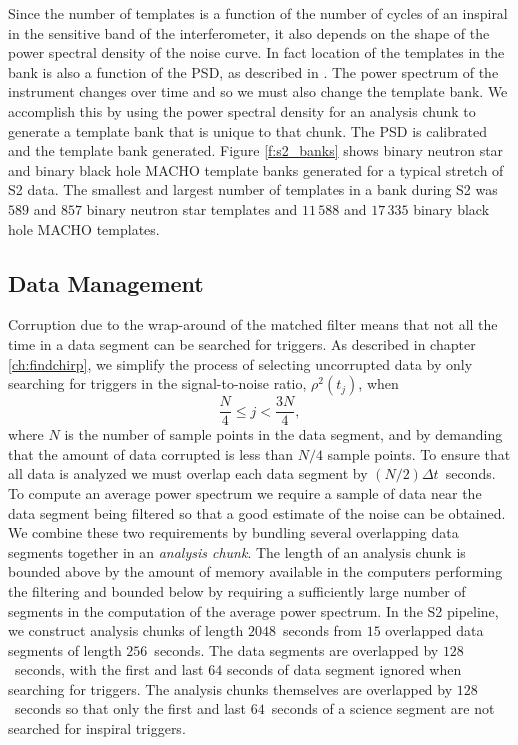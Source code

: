 Since the number of templates is a function of the number of cycles of an
inspiral in the sensitive band of the interferometer, it also depends on the
shape of the power spectral density of the noise curve. In fact location of
the templates in the bank is also a function of the PSD, as described in
\cite{Owen:1998dk}. The power spectrum of the instrument changes over time and
so we must also change the template bank. We accomplish this by using the
power spectral density for an analysis chunk to generate a template bank that
is unique to that chunk. The PSD is calibrated and the template bank
generated. Figure \ref{f:s2_banks} shows binary neutron star and binary
black hole MACHO template banks generated for a typical stretch of S2 data.
The smallest and largest number of templates in a bank during S2 was $589$ and
$857$ binary neutron star templates and $11\,588$ and $17\,335$ binary black
hole MACHO templates.

\subsection{Data Management}
\label{ss:datamanagement}

Corruption due to the wrap-around of the matched filter means that not all the
time in a data segment can be searched for triggers. As described  in chapter
\ref{ch:findchirp}, we simplify the process of selecting uncorrupted data by
only searching for triggers in the signal-to-noise ratio, $\rho^2(t_j)$, when 
\begin{equation}
\frac{N}{4} \le j < \frac{3N}{4},
\end{equation}
where $N$ is the number of sample points in the data segment, and by demanding
that the amount of data corrupted is less than $N/4$ sample points. To ensure
that all data is analyzed we must overlap each data segment by $(N/2)\Delta 
t$~seconds. To compute an average power spectrum we require a sample of data
near the data segment being filtered so that a good estimate of the noise can
be obtained. We combine these two requirements by bundling several overlapping
data segments together in an \emph{analysis chunk}. The length of an analysis
chunk is bounded above by the amount of memory available in the computers
performing the filtering and bounded below by requiring a sufficiently large
number of segments in the computation of the average power spectrum. In the S2
pipeline, we construct analysis chunks of length $2048$~seconds from $15$
overlapped data segments of length $256$~seconds. The data segments are
overlapped by $128$~seconds, with the first and last $64$ seconds of data
segment ignored when searching for triggers. The analysis chunks themselves
are overlapped by $128$~seconds so that only the first and last $64$~seconds
of a science segment are not searched for inspiral triggers.

